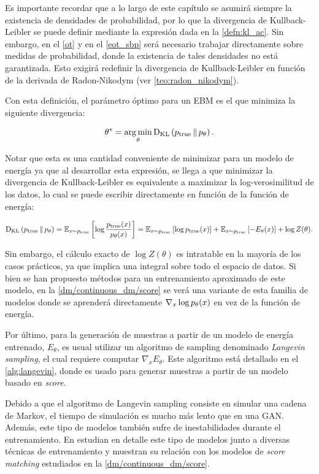 Es importante recordar que a lo largo de este capítulo se asumirá siempre la existencia de densidades de probabilidad, por lo que la divergencia de Kullback-Leibler se puede definir mediante la expresión dada en la \autoref{defn:kl_ac}. Sin embargo, en el \autoref{ot} y en el \autoref{eot_sbp} será necesario trabajar directamente sobre medidas de probabilidad, donde la existencia de tales densidades no está garantizada. Esto exigirá redefinir la divergencia de Kullback-Leibler en función de la derivada de Radon-Nikodym (ver \autoref{teo:radon_nikodym}).

Con esta definición, el parámetro óptimo para un EBM es el que minimiza la siguiente divergencia:

\begin{equation*}
    \theta^* = \operatorname*{arg\,min}_\theta \operatorname{D_{KL}}\left(p_{\text{true}}\,\|\,p_\theta\right).
\end{equation*}

Notar que esta es una cantidad conveniente de minimizar para un modelo de energía ya que al desarrollar esta expresión, se llega a que minimizar la divergencia de Kullback-Leibler es equivalente a maximizar la log-verosimilitud de los datos, lo cual se puede escribir directamente en función de la función de energía:

\begin{equation*}
    \operatorname{D_{KL}}\left(p_{\text{true}}\,\|\,p_\theta\right)
    = \mathbb{E}_{x \sim p_{\text{true}}}\left[\log\frac{p_{\operatorname{true}}(x)}{p_\theta(x)}\right]
    = \mathbb{E}_{x \sim p_{\text{true}}}\left[\log p_{\operatorname{true}}(x)\right] + \mathbb{E}_{x \sim p_{\text{true}}}\left[-E_\theta(x)\right] + \log Z(\theta).
\end{equation*}

Sin embargo, el cálculo exacto de $\log Z(\theta)$ es intratable en la mayoría de los casos prácticos, ya que implica una integral sobre todo el espacio de datos. Si bien se han propuesto métodos para un entrenamiento aproximado de este modelo, en la \autoref{dm/continuous_dm/score} se verá una variante de esta familia de modelos donde se aprenderá directamente $\nabla_{x} \log p_\theta(x)$ en vez de la función de energía.

Por último, para la generación de muestras a partir de un modelo de energía entrenado, $E_\theta$, es usual utilizar un algoritmo de sampling denominado \textit{Langevin sampling}, el cual requiere computar $\nabla_x E_\theta$. Este algoritmo está detallado en el \autoref{alg:langevin}, donde es usado para generar muestras a partir de un modelo basado en \textit{score}.

Debido a que el algoritmo de Langevin sampling consiste en simular una cadena de Markov, el tiempo de simulación es mucho más lento que en una GAN. Además, este tipo de modelos también sufre de inestabilidades durante el entrenamiento. En \cite{song2021trainenergybasedmodels} estudian en detalle este tipo de modelos junto a diversas técnicas de entrenamiento y muestran su relación con los modelos de \textit{score matching} estudiados en la \autoref{dm/continuous_dm/score}.

